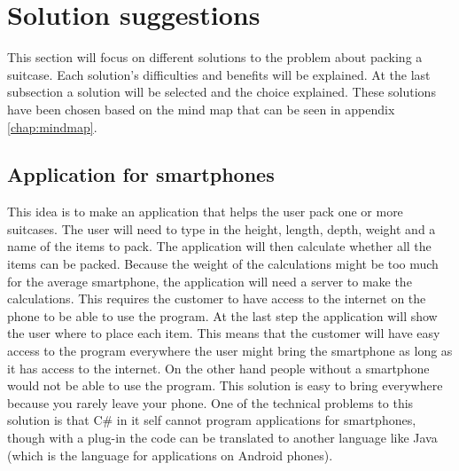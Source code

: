 \section{Solution suggestions} 	
This section will focus on different solutions to the problem about packing a suitcase. Each solution's difficulties and benefits will be explained. At the last subsection a solution will be selected and the choice explained. These solutions have been chosen based on the mind map that can be seen in appendix  \ref{chap:mindmap}.

\subsection{Application for smartphones}
This idea is to make an application that helps the user pack one or more suitcases. The user will need to type in the height, length, depth, weight and a name of the items to pack. The application will then calculate whether all the items can be packed. Because the weight of the calculations might be too much for the average smartphone, the application will need a server to make the calculations. This requires the customer to have access to the internet on the phone to be able to use the program. At the last step the application will show the user where to place each item. This means that the customer will have easy access to the program everywhere the user might bring the smartphone as long as it has access to the internet. On the other hand people without a smartphone would not be able to use the program. This solution is easy to bring everywhere because you rarely leave your phone. One of the technical problems to this solution is that C\# in it self cannot program applications for smartphones, though with a plug-in the code can be translated to another language like Java (which is the language for applications on Android phones).

